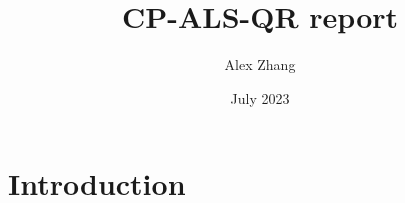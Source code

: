 \documentclass{article}
\title{CP-ALS-QR report}
\author{Alex Zhang}
\date{July 2023}
\begin{document}
\maketitle
\section{Introduction}
\end{document}
